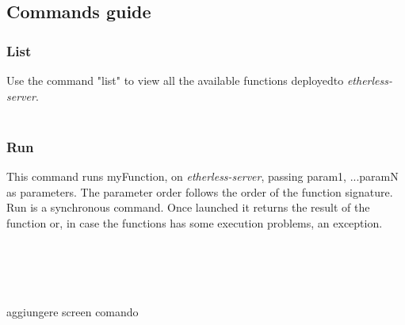\subsection{Commands guide}
\subsubsection{List}
Use the command "list" to view all the available functions deployed\glo to \textit{etherless-server}.\\\\
\centerline{}





\subsubsection{Run}
This command runs myFunction, on \textit{etherless-server}, passing param1, ...paramN as parameters. The parameter order follows the order of the function signature. Run is a synchronous command. Once launched it returns the result of the function or, in case the functions has some execution problems, an exception.\\\\
\centerline{}\\
\\
\\
aggiungere screen comando

